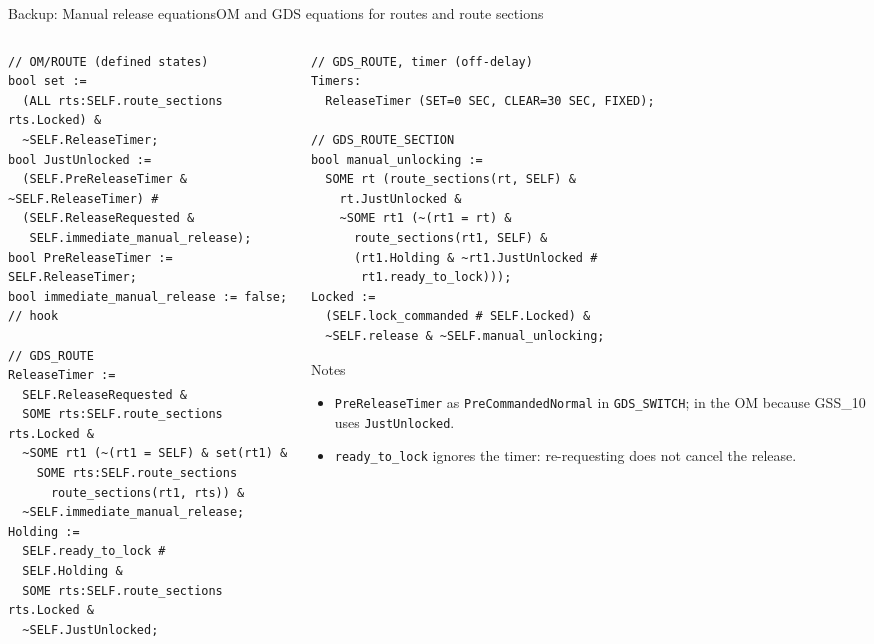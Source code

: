 \documentclass[aspectratio=169,10pt]{beamer}
\newcommand{\smallfont}{\fontsize{7}{8.6}\selectfont}
\begin{document}
\begin{frame}[fragile]{Backup: Manual release equations}{OM and GDS equations for routes and route sections}
  \begin{columns}[T]
    \begin{column}{0.52\textwidth}
      \begin{codebox}[top=0.5mm,bottom=0.5mm]
\begin{lstlisting}[basicstyle=\fontsize{5.8}{6.7}\ttfamily]
// OM/ROUTE (defined states)
bool set :=
  (ALL rts:SELF.route_sections rts.Locked) &
  ~SELF.ReleaseTimer;
bool JustUnlocked :=
  (SELF.PreReleaseTimer & ~SELF.ReleaseTimer) #
  (SELF.ReleaseRequested &
   SELF.immediate_manual_release);
bool PreReleaseTimer := SELF.ReleaseTimer;
bool immediate_manual_release := false;  // hook

// GDS_ROUTE
ReleaseTimer :=
  SELF.ReleaseRequested &
  SOME rts:SELF.route_sections rts.Locked &
  ~SOME rt1 (~(rt1 = SELF) & set(rt1) &
    SOME rts:SELF.route_sections
      route_sections(rt1, rts)) &
  ~SELF.immediate_manual_release;
Holding :=
  SELF.ready_to_lock #
  SELF.Holding &
  SOME rts:SELF.route_sections rts.Locked &
  ~SELF.JustUnlocked;
\end{lstlisting}
      \end{codebox}
    \end{column}

    \begin{column}{0.46\textwidth}
      \begin{codebox}[top=0.5mm,bottom=0.5mm]
\begin{lstlisting}[basicstyle=\fontsize{5.8}{6.7}\ttfamily]
// GDS_ROUTE, timer (off-delay)
Timers:
  ReleaseTimer (SET=0 SEC, CLEAR=30 SEC, FIXED);

// GDS_ROUTE_SECTION
bool manual_unlocking :=
  SOME rt (route_sections(rt, SELF) &
    rt.JustUnlocked &
    ~SOME rt1 (~(rt1 = rt) &
      route_sections(rt1, SELF) &
      (rt1.Holding & ~rt1.JustUnlocked #
       rt1.ready_to_lock)));
Locked :=
  (SELF.lock_commanded # SELF.Locked) &
  ~SELF.release & ~SELF.manual_unlocking;
\end{lstlisting}
      \end{codebox}
      \vspace{-1mm}
      \begin{proverbox}[top=0.6mm,bottom=0.6mm]{Notes}
        \begin{itemize}\smallfont
          \item \texttt{PreReleaseTimer} as \texttt{PreCommandedNormal} in \texttt{GDS\_SWITCH}; in the OM because GSS\_10 uses \texttt{JustUnlocked}.
          \item \texttt{ready\_to\_lock} ignores the timer: re-requesting does not cancel the release.
        \end{itemize}
      \end{proverbox}
    \end{column}
  \end{columns}
\end{frame}
\end{document}
